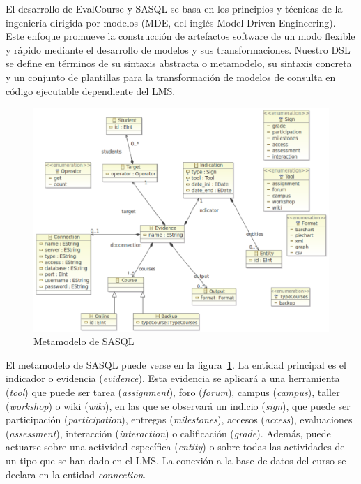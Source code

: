 			El desarrollo de EvalCourse y SASQL se basa en los principios y técnicas de la ingeniería dirigida por modelos (MDE, del inglés Model-Driven Engineering). Este enfoque promueve la construcción de artefactos software de un modo flexible y rápido mediante el desarrollo de modelos y sus transformaciones. Nuestro DSL se define en términos de su sintaxis abstracta o metamodelo, su sintaxis concreta y un conjunto de plantillas para la transformación de modelos de consulta en código ejecutable dependiente del LMS. 

\begin{figure}
  \begin{center}
    \includegraphics[scale=0.4]{EvcMetamodel.png}
  \end{center}
  \caption{Metamodelo de SASQL}
  \label{fig:EvcMetamodel}
\end{figure}

			El metamodelo de SASQL puede verse en la figura~\ref{fig:EvcMetamodel}. La entidad principal es el indicador o evidencia (\emph{evidence}). Esta evidencia se aplicará a una herramienta (\emph{tool}) que puede ser tarea (\emph{assignment}), foro (\emph{forum}), campus (\emph{campus}), taller (\emph{workshop}) o wiki (\emph{wiki}), en las que se observará un indicio (\emph{sign}), que puede ser participación (\emph{participation}), entregas (\emph{milestones}), accesos (\emph{access}), evaluaciones (\emph{assessment}), interacción (\emph{interaction}) o calificación (\emph{grade}). Además, puede actuarse sobre una actividad específica (\emph{entity}) o sobre todas las actividades de un tipo que se han dado en el LMS. La conexión a la base de datos del curso se declara en la entidad \emph{connection}. 

